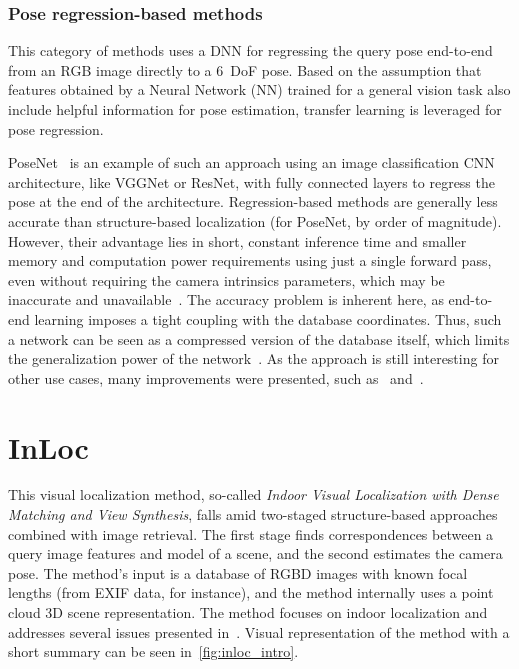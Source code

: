 \subsubsection*{Pose regression-based methods}

This category of methods uses a DNN for regressing the query pose end-to-end from an RGB image
directly to a 6~DoF pose. Based on the assumption that features obtained by a Neural Network (NN) trained for a general vision task
also include helpful information for pose estimation, transfer learning is leveraged for pose regression.

PoseNet~\citep{PoseNet} is an example of such an approach using an image classification CNN architecture, like
VGGNet or ResNet, with fully connected layers to regress the pose at the end of the architecture. Regression-based
methods are generally less accurate than structure-based localization (for PoseNet, by order of magnitude).
However, their advantage lies in short, constant inference time and smaller memory and computation power requirements
using just a single forward pass, even without requiring the camera intrinsics parameters, which may be
inaccurate and unavailable~\citep{RegressionAutoEnc}. The accuracy problem is inherent here, as end-to-end
learning imposes a tight coupling with the database coordinates. Thus, such a network can be seen as a compressed
version of the database itself, which limits the generalization power of the network~\citep{naverlabs}. As the approach is still
interesting for other use cases, many improvements were presented, such as~\citet{DNNRegression, Maps, VLocNet}
and~\citet{VLocNetpp}.


\section{InLoc}\label{sec:inloc}
This visual localization method, so-called \emph{Indoor Visual Localization with Dense Matching
and View Synthesis}, falls amid two-staged structure-based approaches combined with image retrieval. The first stage finds
correspondences between a query image features and model of a scene, and the second estimates the camera pose.
The method's input is a database of RGBD
images with known focal lengths (from EXIF data, for instance), and the method internally uses a point cloud 3D scene
representation. The method focuses on indoor localization and addresses several
issues presented in~. Visual representation of the method with a short summary can be seen in~\cref{fig:inloc_intro}.

